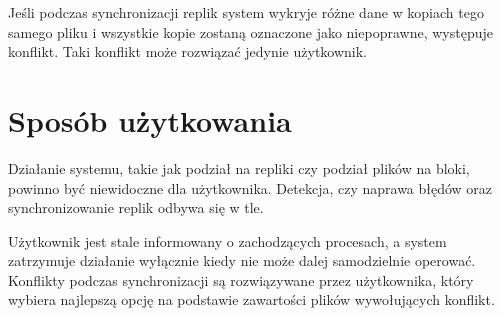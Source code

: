 Jeśli podczas synchronizacji replik system wykryje różne dane w kopiach tego samego pliku i wszystkie kopie zostaną oznaczone jako niepoprawne, występuje konflikt. Taki konflikt może rozwiązać jedynie użytkownik.  

\section {Sposób użytkowania}
Działanie systemu, takie jak podział na repliki czy podział plików na bloki, powinno być niewidoczne dla użytkownika. Detekcja, czy naprawa błędów oraz synchronizowanie replik odbywa się w tle.

Użytkownik jest stale informowany o zachodzących procesach, a system zatrzymuje działanie wyłącznie kiedy nie może dalej samodzielnie operować. Konflikty podczas synchronizacji są rozwiązywane przez użytkownika, który wybiera najlepszą opcję na podstawie zawartości plików wywołujących konflikt.

